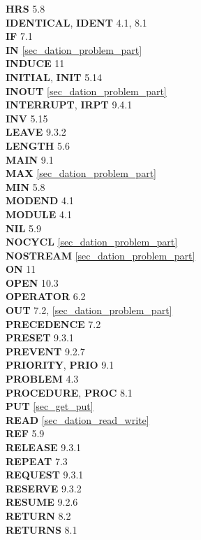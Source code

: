 {{{\bf HRS} 5.8\\
 
{\bf IDENTICAL}, {\bf IDENT} 4.1, 8.1\\
{\bf IF} 7.1\\                           
{\bf IN} \ref{sec_dation_problem_part}\\
{\bf INDUCE} 11\\
{\bf INITIAL}, {\bf INIT} 5.14\\
{\bf INOUT} \ref{sec_dation_problem_part}\\
{\bf INTERRUPT}, {\bf IRPT} 9.4.1\\
{\bf INV} 5.15\\
 
{\bf LEAVE} 9.3.2\\
{\bf LENGTH} 5.6\\
 
{\bf MAIN} 9.1\\
{\bf MAX} \ref{sec_dation_problem_part}\\
{\bf MIN} 5.8\\
{\bf MODEND} 4.1\\
{\bf MODULE} 4.1\\
 
{\bf NIL} 5.9\\
{\bf NOCYCL} \ref{sec_dation_problem_part}\\
{\bf NOSTREAM} \ref{sec_dation_problem_part}\\

{\bf ON} 11\\
{\bf OPEN} 10.3\\
{\bf OPERATOR} 6.2\\
{\bf OUT} 7.2, \ref{sec_dation_problem_part}\\
 
{\bf PRECEDENCE} 7.2\\
{\bf PRESET} 9.3.1\\
{\bf PREVENT} 9.2.7\\
{\bf PRIORITY}, {\bf PRIO} 9.1\\
{\bf PROBLEM} 4.3\\
{\bf PROCEDURE}, {\bf PROC} 8.1\\
{\bf PUT} \ref{sec_get_put}\\

{\bf READ} \ref{sec_dation_read_write}\\
{\bf REF} 5.9\\
{\bf RELEASE} 9.3.1\\
{\bf REPEAT} 7.3\\
{\bf REQUEST} 9.3.1\\
{\bf RESERVE} 9.3.2\\
{\bf RESUME} 9.2.6\\
{\bf RETURN} 8.2\\
{\bf RETURNS} 8.1\\
 
}}
